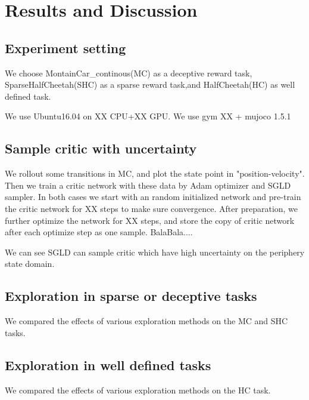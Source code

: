 \section{Results and Discussion}
\subsection{Experiment setting}
We choose MontainCar\_continous(MC) as a deceptive reward task, SparseHalfCheetah(SHC) as a sparse reward task,and HalfCheetah(HC) as well defined task.

We use Ubuntu16.04 on XX CPU+XX GPU. We use gym XX + mujoco 1.5.1
\subsection{Sample critic with uncertainty}
We rollout some transitions in MC, and plot the state point in "position-velocity". Then we train a critic network with these data by Adam optimizer and SGLD sampler. In both cases we start with an random initialized network and pre-train the critic network for XX steps to make sure convergence. After preparation, we further optimize the network for XX steps, and store the copy of critic network after each optimize step as one sample. BalaBala....

We can see SGLD can sample critic which have high uncertainty on the periphery state domain.

\subsection{Exploration in sparse or deceptive tasks}

We compared the effects of various exploration methods on the MC and SHC tasks.

\subsection{Exploration in well defined tasks}

We compared the effects of various exploration methods on the HC task.

